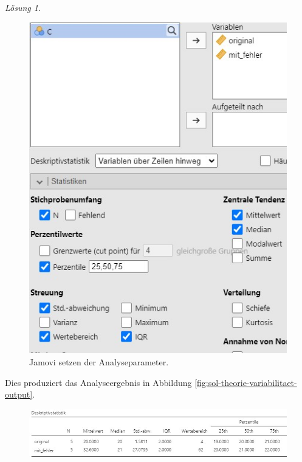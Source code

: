 \documentclass[
]{book}
\theoremstyle{definition}
\theoremstyle{definition}
\theoremstyle{definition}
\theoremstyle{definition}
\theoremstyle{remark}
\newtheorem*{solution}{Lösung}
\begin{document}
\begin{solution}
\begin{figure}

{\centering \includegraphics[width=1\linewidth]{figures/02-exr-theorie-variabilitaet-jmv-input} 

}

\caption{Jamovi setzen der Analyseparameter.}\label{fig:sol-theorie-variabilitaet-input}
\end{figure}

Dies produziert das Analyseergebnis in Abbildung \ref{fig:sol-theorie-variabilitaet-output}.

\begin{figure}

{\centering \includegraphics[width=1\linewidth]{figures/02-exr-theorie-variabilitaet-jmv-output} 

}
\end{figure}
\end{solution}
\end{document}
